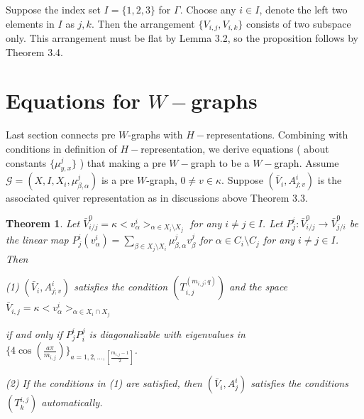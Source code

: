 \def\CTEXPreproc{Created by ctex v0.2.12, don't edit!}\documentclass[11pt]{article}
\newtheorem{thm}{Theorem}[section]
\begin{document}
\begin{pf} Suppose the index set $I=\{ 1,2,3 \}$ for $\Gamma$. Choose any $i\in I$, denote the left two elements in $I$ as $j,k$.
Then the arrangement $\{ V_{i,j} ,V_{i,k} \} $ consists of two subspace only. This arrangement must be flat by Lemma 3.2,  so the
proposition follows by Theorem 3.4.
\end{pf}








\section{Equations for $W-$graphs }

Last section connects pre $W$-graphs with $H-$representations. Combining with conditions in definition of  $H-$representation, we derive equations ( about constants $\{ \mu^j _{y,x} \}$ ) that making a pre $W-$graph to be a $W-$graph.
 Assume  $\mathcal{G}=(X, I, X_i , \mu^j _{\beta ,\alpha} ) $ is a pre $W$-graph, $0\neq v\in \kappa$. Suppose $(\bar{V}_i , A^i _{j;v})$ is the associated quiver representation as in discussions above Theorem 3.3.

\begin{thm} Let $\bar{V}^0 _{i/j} =\kappa < v^i _{\alpha} >_{\alpha \in X_i \setminus X_j } $ for any $i\neq j\in I$.  Let $P^i _j : \bar{V}^0 _{i/j} \rightarrow \bar{V}^0 _{j/i}$ be the linear map
 $P^i _j ( v^i _{\alpha})=\sum_{ \beta \in X_j \setminus X_i } \mu^j _{\beta,\alpha} v^j _{\beta}  $ for $\alpha \in C_i \setminus C_j $ for any $i\neq j \in I$. Then

\noindent(1) $( \bar{V}_i , A^i _{j;v} )$ satisfies the condition $(T^{(m_{i,j};q)}_{i,j})$ and the space $\bar{V}_{i,j} = \kappa < v^i _{\alpha} >_{\alpha \in X_i \cap X_j }$

if and only if $P^i _j  P^j _i $ is diagonalizable  with eigenvalues in $\{ 4\cos ( \frac{a\pi}{m_{i,j} } ) \} _{a=1,2,...,[\frac{m_{i,j}-1}{2}]   } $.

\noindent(2) If the conditions in (1) are satisfied, then $(\bar{V}_i , A^i _j )$ satisfies the conditions $( T^{i,j} _k  ) $ automatically.

\end{thm}
\end{document}
